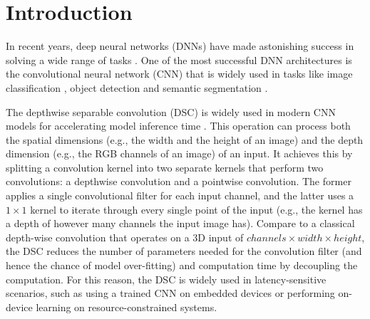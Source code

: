 \section{Introduction}

In recent years, deep neural networks (DNNs) have made astonishing success in solving a wide range of tasks \FIXME{\cite{}}. One of the
most successful DNN architectures is the convolutional neural network (CNN) that is widely used in tasks like image classification
\FIXME{\cite{}}, object detection \FIXME{\cite{}} and  semantic segmentation \FIXME{\cite{}}.


The depthwise separable convolution (DSC) is widely used in modern CNN models for accelerating model inference time \FIXME{\cite{}}. This
operation can process both the spatial dimensions (e.g., the width and the height of an image) and the depth dimension (e.g., the RGB
channels of an image) of an input. It achieves this by splitting a convolution kernel into two separate kernels that perform two
convolutions: a depthwise convolution and a pointwise convolution. The former applies a single convolutional filter for each input channel,
and the latter uses a $1 \times 1$ kernel to iterate through every single point of the input (e.g., the kernel has a depth of however many
channels the input image has). Compare to a classical depth-wise convolution that operates on a 3D input of $channels \times width \times
height$, the DSC reduces the number of parameters needed for the convolution filter (and hence the chance of model over-fitting) and
computation time by decoupling the computation. For this reason, the DSC is widely used in latency-sensitive scenarios, such as using a
trained CNN on embedded devices or performing on-device learning on resource-constrained systems.


